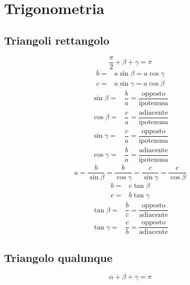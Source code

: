 \chapter{Trigonometria}
\section{Triangoli rettangolo}
\begin{center}
		
\end{center}
\begin{equation}
\dfrac{\pi}{2}+\beta+\gamma=\pi
\end{equation}
\begin{align}
b=&a\sin\beta=a\cos\gamma\\
c=&a\sin\gamma=a\cos\beta
\end{align}
\begin{align}
\sin\beta=&\dfrac{b}{a}=\dfrac{\text{opposto}}{\text{ipotenusa}}\\
\cos\beta=&\dfrac{c}{a}=\dfrac{\text{adiacente}}{\text{ipotenusa}}\\
\sin\gamma=&\dfrac{c}{a}=\dfrac{\text{opposto}}{\text{ipotenusa}}\\
\cos\gamma=&\dfrac{b}{a}=\dfrac{\text{adiacente}}{\text{ipotenusa}}
\end{align}
\begin{equation}
a=\dfrac{b}{\sin\beta}=\dfrac{b}{\cos\gamma}=\dfrac{c}{\sin\gamma}=\dfrac{c}{\cos\beta}
\end{equation}
\begin{align}
b=&c\tan\beta\\
c=&b\tan\gamma
\end{align}
\begin{align}
\tan\beta=&\dfrac{b}{c}=\dfrac{\text{opposto}}{\text{adiacente}}\\
\tan\gamma=&\dfrac{c}{b}=\dfrac{\text{opposto}}{\text{adiacente}}
\end{align}
\section{Triangolo qualunque}
\begin{center}
	
\end{center}
\begin{equation}
\alpha+\beta+\gamma=\pi
\end{equation}
